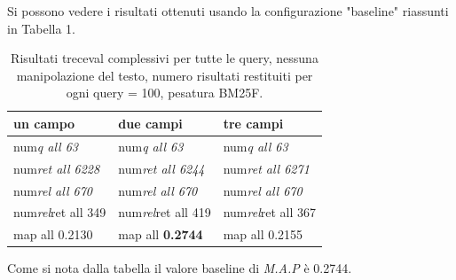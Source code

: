 \documentclass[runningheads]{llncs}
\begin{document}
Si possono vedere i risultati ottenuti usando la configurazione "baseline" riassunti in Tabella 1.
\par


\begin{table}
\centering
\begin{tabular}{lll}
\hline
\textbf{ un campo }           & \textbf{ due campi }           & \textbf{ tre campi }            \\ \hline
 num\textit{q all 63 }       &  num\textit{q all 63 }       &  num\textit{q all 63 }        \\
 num\textit{ret all 6228 }  &  num\textit{ret all 6244 }  &  num\textit{ret all 6271 }   \\
 num\textit{rel all 670 }    &  num\textit{rel all 670 }    &  num\textit{rel all 670 }     \\
 num\textit{rel}ret all 349  &  num\textit{rel}ret all 419  &  num\textit{rel}ret all 367   \\
map all 0.2130               & map all \bf 0.2744               & map all 0.2155 \\ \hline
\end{tabular}

\caption{ Risultati treceval complessivi per tutte le query, nessuna manipolazione del testo, numero risultati restituiti per
ogni query = 100, pesatura BM25F.}
\end{table}

Come si nota dalla tabella il valore baseline di \textit{M.A.P} \`e 0.2744.
\par

%
%
%
%
\end{document}
